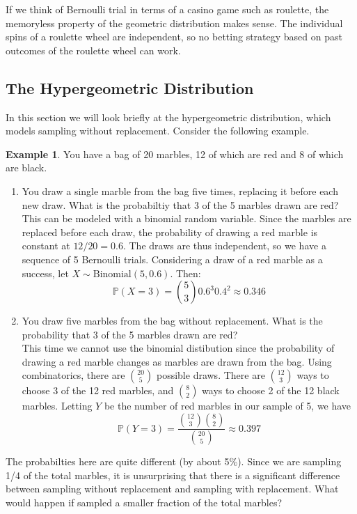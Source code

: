 \documentclass[12pt]{article}
\theoremstyle{definition}
\newtheorem*{example}{Example}
\theoremstyle{remark}
\def\P{{\mathbb P}}
\begin{document}
If we think of Bernoulli trial in terms of a casino game such as roulette, the memoryless property of the geometric distribution makes sense. The individual spins of a roulette wheel are independent, so no betting strategy based on past outcomes of the roulette wheel can work.

\subsection{The Hypergeometric Distribution}

In this section we will look briefly at the hypergeometric distribution, which models sampling without replacement.
Consider the following example.

\begin{example}You have a bag of 20 marbles, 12 of which are red and 8 of which are black.
\begin{enumerate}
\item You draw a single marble from the bag five times, replacing it before each new draw. What is the probabiltiy that 3 of the 5 marbles drawn are red?\\

This can be modeled with a binomial random variable. Since the marbles are replaced before each draw, the probability of drawing a red marble is constant at $12/20 = 0.6$. The draws are thus independent, so we have a sequence of 5 Bernoulli trials. Considering a draw of a red marble as a success, let $X\sim\text{Binomial}(5, 0.6)$. Then:
\[
\P(X = 3) = \binom{5}{3} 0.6^3 0.4^2 \approx 0.346
\]

\item You draw five marbles from the bag without replacement. What is the probability that 3 of the 5 marbles drawn are red?\\

This time we cannot use the binomial distibution since the probability of drawing a red marble changes as marbles are drawn from the bag. Using combinatorics, there are $\binom{20}{5}$ possible draws. There are $\binom{12}{3}$ ways to choose 3 of the 12 red marbles, and $\binom{8}{2}$ ways to choose 2 of the 12 black marbles. Letting $Y$ be the number of red marbles in our sample of 5, we have
\[
\P(Y = 3) = \frac{ \binom{12}{3}\binom{8}{2}}{\binom{20}{5}} \approx 0.397
\]
\end{enumerate}
\end{example}

The probabilties here are quite different (by about 5\%). Since we are sampling 1/4 of the total marbles, it is unsurprising that there is a significant difference between sampling without replacement and sampling with replacement. What would happen if sampled a smaller fraction of the total marbles?
\end{document}
